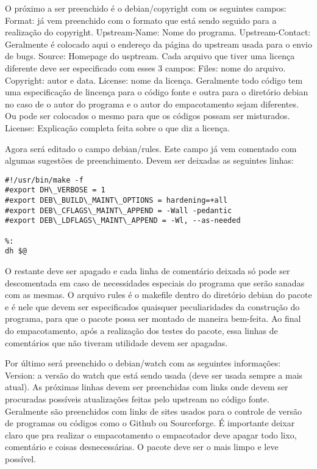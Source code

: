 O próximo a ser preenchido é o debian/copyright com os seguintes campos:
Format: já vem preenchido com o formato que está sendo seguido para a realização do  copyright.
Upstream-Name: Nome do programa.
Upstream-Contact: Geralmente é colocado aqui o endereço da página do upstream usada para o envio de bugs.
Source: Homepage do usptream.
Cada arquivo que tiver uma licença diferente deve ser especificado com esses 3 campos:
Files: nome do arquivo.
Copyright: autor e data.
License: nome da licença.
Geralmente todo código tem uma especificação de lincença  para o código fonte e outra para o diretório debian no caso de o autor do programa e o autor do empacotamento sejam diferentes. Ou pode ser colocados o mesmo para que os códigos possam ser misturados.
License: Explicação completa feita sobre o que diz a licença. 

Agora será editado o campo debian/rules. Este campo já vem comentado com algumas sugestões de preenchimento. Devem ser deixadas as seguintes linhas:
\begin{verbatim}
#!/usr/bin/make -f
#export DH\_VERBOSE = 1
#export DEB\_BUILD\_MAINT\_OPTIONS = hardening=+all
#export DEB\_CFLAGS\_MAINT\_APPEND = -Wall -pedantic
#export DEB\_LDFLAGS\_MAINT\_APPEND = -Wl, --as-needed

%:
dh $@

\end{verbatim}
O restante deve ser apagado e cada linha de comentário deixada só pode ser descomentada em caso de necessidades especiais do programa que serão sanadas com as mesmas. O arquivo rules é o makefile dentro do diretório debian do pacote e é nele que devem ser especificados quaisquer peculiaridades da construção do programa, para que o pacote possa ser montado de maneira bem-feita. Ao final do empacotamento, após a realização dos testes do pacote, essa linhas de comentários que não tiveram utilidade devem ser apagadas.

Por último será preenchido o debian/watch com as seguintes informações:
Version: a versão do watch que está sendo usada (deve ser usada sempre a mais atual).
As próximas linhas devem ser preenchidas com links onde devem ser procuradas possíveis atualizações feitas pelo upstream no código fonte. Geralmente são preenchidos com links de sites usados para o controle de versão de programas ou códigos como o Github ou Sourceforge.
É importante deixar claro que pra realizar o empacotamento o empacotador deve apagar todo lixo, comentário e coisas desnecessárias. O pacote deve ser o mais limpo e leve possível.

